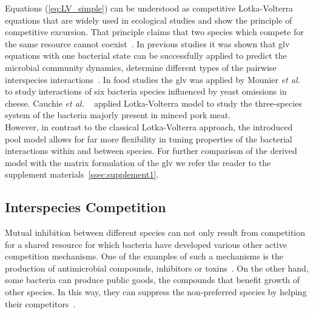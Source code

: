 \documentclass[10pt,A4paper]{article}
\numberwithin{equation}{section}
\newcommand{\etal}{{\textit{et al. }}}
\begin{document}
%
Equations (\ref{eq:LV_simple}) can be understood as competitive Lotka-Volterra equations that are widely used in ecological studies and show the principle of competitive excursion.
That principle claims that two species which compete for the same resource cannot coexist~\cite{wangersky_lotka-volterra_1978}.
In previous studies it was shown that \ac{glv} equations with one bacterial state can be successfully applied to predict the microbial community dynamics, determine different types of the pairwise interspecies interactions~\cite{dedrick_when_2023, stein_ecological_2013, venturelli_deciphering_2018, hoffmann_power_2007}.
In food studies the \ac{glv} was applied by Mounier \etal~\cite{mounier_microbial_2008} to study interactions of six bacteria species influenced by yeast omissions in cheese.
Cauchie \etal~\cite{cauchie_modeling_2020} applied Lotka-Volterra model to study the three-species system of the bacteria majorly present in minced pork meat.\\
%
However, in contrast to the classical Lotka-Volterra approach, the introduced pool model allows for far more flexibility in tuning properties of the bacterial interactions within and between species.
For further comparison of the derived model with the matrix formulation of the \ac{glv} we refer the reader to the supplement materials~\ref{ssec:supplement1}.
%
%
%
\subsection{Interspecies Competition}
Mutual inhibition between different species can not only result from competition for a shared resource for which bacteria have developed various other active competition mechanisms.
One of the examples of such a mechanisms is the production of antimicrobial compounds, inhibitors or toxins~\cite{wloch-salamon_effect_2008, chao_structured_1981}.
On the other hand, some bacteria can produce public goods, the compounds that benefit growth of other species.
In this way, they can suppress the non-preferred species by helping their competitors~\cite{hibbing_bacterial_2010}.
%
%
\end{document}
